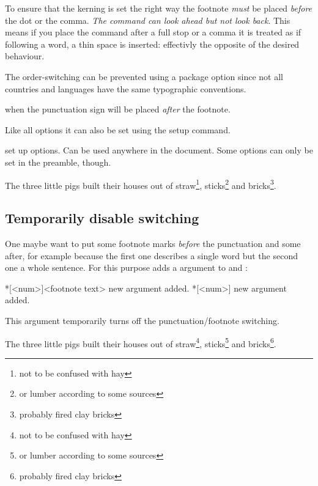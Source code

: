 \documentclass[toc=index,toc=bib]{cnpkgdoc}
\begin{document}
To ensure that the kerning is set the right way the footnote \emph{must} be placed
\emph{before} the dot or the comma. \emph{The command can look ahead but not look back}.
This means if you place the  command after a full stop or a comma it is
treated as if following a word, \ie a thin space is inserted: effectivly the opposite 
of the desired behaviour.

The order-switching can be prevented using a package option since not all countries
and languages have the same typographic conventions.
\begin{beschreibung}
  when  the punctuation sign
 will be placed \emph{after} the footnote.
\end{beschreibung}
Like all options it can also be set using the setup command.
\begin{beschreibung}
  set up options. Can be used anywhere in the document.
 Some options can only be set in the preamble, though.
\end{beschreibung}
\begin{beispiel}
 \begin{minipage}{.4\linewidth}
  \noindent The three little pigs built their houses
  out of straw\footnote{not to be confused with hay},
  sticks\footnote{or lumber according to some sources}
  and bricks\footnote{probably fired clay bricks}.
 \end{minipage}
\end{beispiel}

\subsection{Temporarily disable switching}
One maybe want to put some footnote marks \emph{before} the punctuation and some
after, for example because the first one describes a single word but the second
one a whole sentence. For this purpose \fnpct adds a \code{*} argument to 
and :
\begin{beschreibung}
 *[<num>]{<footnote text>} new \code{*} argument added.
 *[<num>] new \code{*} argument added.
\end{beschreibung}
This argument temporarily turns off the punctuation/footnote switching.
\begin{beispiel}
 \begin{minipage}{.4\linewidth}
  \noindent The three little pigs built their houses
  out of straw\footnote*{not to be confused with hay},
  sticks\footnote{or lumber according to some sources}
  and bricks\footnote{probably fired clay bricks}.
 \end{minipage}
\end{beispiel}
\end{document}
